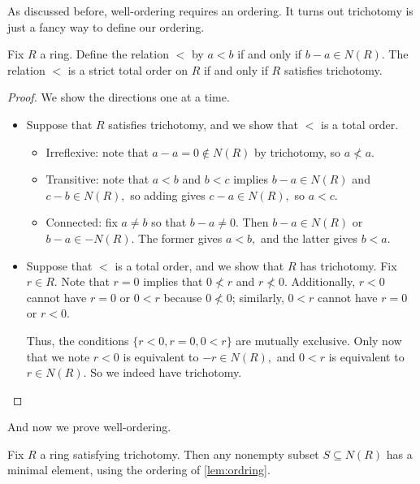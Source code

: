 \documentclass{article}
\begin{document}
As discussed before, well-ordering requires an ordering. It turns out trichotomy is just a fancy way to define our ordering.
\begin{lemma} \label{lem:ordring}
	Fix $R$ a ring. Define the relation $<$ by $a<b$ if and only if $b-a\in N(R).$ The relation $<$ is a strict total order on $R$ if and only if $R$ satisfies trichotomy.
\end{lemma}
\begin{proof}
	We show the directions one at a time.
	\begin{itemize}
		\item Suppose that $R$ satisfies trichotomy, and we show that $<$ is a total order.
		\begin{itemize}
			\item Irreflexive: note that $a-a=0\notin N(R)$ by trichotomy, so $a\not<a.$
			\item Transitive: note that $a<b$ and $b<c$ implies $b-a\in N(R)$ and $c-b\in N(R),$ so adding gives $c-a\in N(R),$ so $a<c.$
			\item Connected: fix $a\ne b$ so that $b-a\ne0.$ Then $b-a\in N(R)$ or $b-a\in-N(R).$ The former gives $a<b,$ and the latter gives $b<a.$
		\end{itemize}
		\item Suppose that $<$ is a total order, and we show that $R$ has trichotomy. Fix $r\in R.$ Note that $r=0$ implies that $0\not<r$ and $r\not<0.$ Additionally, $r<0$ cannot have $r=0$ or $0<r$ because $0\not<0$; similarly, $0<r$ cannot have $r=0$ or $r<0.$

		Thus, the conditions $\{r<0,r=0,0<r\}$ are mutually exclusive. Only now that we note $r<0$ is equivalent to $-r\in N(R),$ and $0<r$ is equivalent to $r\in N(R).$ So we indeed have trichotomy.
		\qedhere
	\end{itemize}
\end{proof}
And now we prove well-ordering.
\begin{proposition} \label{lem:provewellorder}
	Fix $R$ a ring satisfying trichotomy. Then any nonempty subset $S\subseteq N(R)$ has a minimal element, using the ordering of \autoref{lem:ordring}.
\end{proposition}
\end{document}
